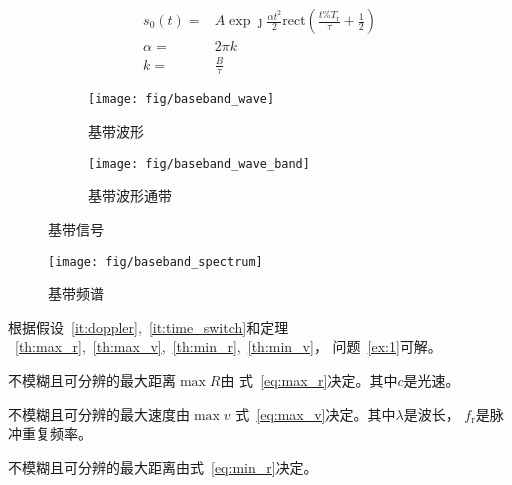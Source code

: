 \documentclass[../main]{subfiles}
\begin{document}
\begin{align}
  \label{eq:baseband_wave}
  s_0(t) = & A\exp{\jmath\frac{\alpha t^2}{2}}
  \mathrm{rect}\left(\frac{t\%T_\mathrm{r}}{\tau} + \frac{1}{2}\right)\\
  \alpha = & 2\pi k\\
  k = & \frac{B}{\tau}
\end{align}

\begin{figure}[htbp]
  \centering
  \begin{subfigure}[htbp]{0.45\linewidth}
    \centering
    \texttt{[image: fig/baseband\_wave]}
    \caption{基带波形}%
    \label{fig:baseband_wave}
  \end{subfigure}
  \quad
  \begin{subfigure}[htbp]{0.45\linewidth}
    \centering
    \texttt{[image: fig/baseband\_wave\_band]}
    \caption{基带波形通带}%
    \label{fig:baseband_wave_band}
  \end{subfigure}
  \caption{基带信号}%
  \label{fig:baseband}
\end{figure}

\begin{figure}[htbp]
  \centering
  \texttt{[image: fig/baseband\_spectrum]}
  \caption{基带频谱}%
  \label{fig:baseband_spectrum}
\end{figure}

根据假设~\ref{it:doppler},~\ref{it:time_switch}和定理%
~\ref{th:max_r},~\ref{th:max_v},~\ref{th:min_r},~\ref{th:min_v}，
问题~\ref{ex:1}可解。

\begin{theorem}[不模糊距离]%
  \label{th:max_r}
  不模糊且可分辨的最大距离$\max{R}$由
  式~\ref{eq:max_r}决定。其中$c$是光速。
\end{theorem}

\begin{theorem}[不模糊速度]%
  \label{th:max_v}
  不模糊且可分辨的最大速度由$\max{v}$
  式~\ref{eq:max_v}决定。其中$\lambda$是波长，
  $f_\mathrm{r}$是脉冲重复频率。
\end{theorem}

\begin{theorem}[距离分辨力]%
  \label{th:min_r}
  不模糊且可分辨的最大距离由式~\ref{eq:min_r}决定。
\end{theorem}
\end{document}
